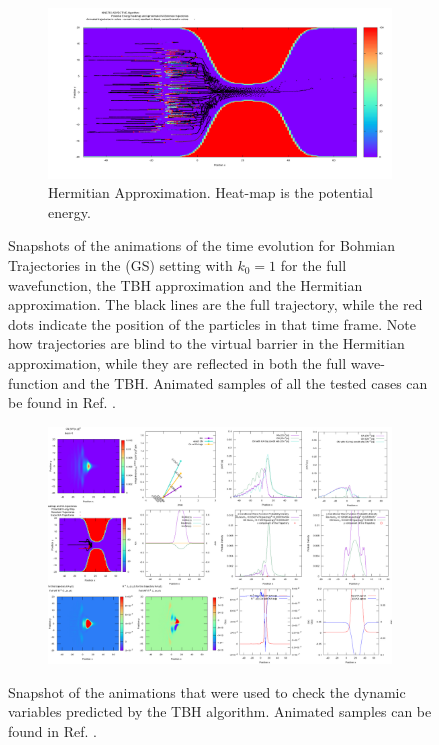 \documentclass[11pt, a4paper]{article} %
\begin{document}
\begin{figure}[h!]
\begin{subfigure}[b]{0.7\linewidth}
  \end{subfigure}
  \begin{subfigure}[b]{0.7\linewidth}
    \includegraphics[width=\linewidth]{k0_0.1_XO_GS.png}
    \caption{Hermitian Approximation. Heat-map is the potential energy.}
  \end{subfigure}
  
  \caption{ Snapshots of the animations of the time evolution for Bohmian Trajectories in the (GS) setting with $k_0=1$ for the full wavefunction, the TBH approximation and the Hermitian approximation. The black lines are the full trajectory, while the red dots indicate the position of the particles in that time frame. Note how trajectories are blind to the virtual barrier in the Hermitian approximation, while they are reflected in both the full wave-function and the TBH. Animated samples of all the tested cases can be found in Ref. \cite{DATA}.}
  \label{fig:trajs}
\end{figure}


\begin{figure}[h!]
  \centering
  \begin{subfigure}[b]{1.0\linewidth}
    \includegraphics[width=\linewidth]{screenshoot.png}
  \end{subfigure}  
  \caption{ Snapshot of the animations that were used to check the dynamic variables predicted by the TBH algorithm. Animated samples can be found in Ref. \cite{DATA}. }
  \label{fig:screenshoot}
\end{figure}
\end{document}
